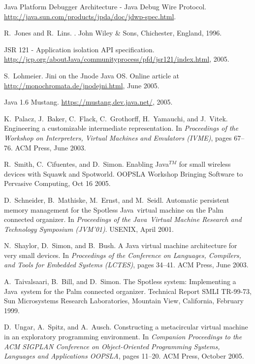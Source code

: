 \documentclass{sigplanconf}
\begin{document}
\begin{thebibliography}{GFWK02}
Java {P}latform {D}ebugger {A}rchitecture - {J}ava {D}ebug {W}ire {P}rotocol.
\newblock \url{http://java.sun.com/products/jpda/doc/jdwp-spec.html}.

\vfill\eject

R.~Jones and R.~Lins.
.
\newblock John Wiley \& Sons, Chichester, England, 1996.

{JSR} 121 - {A}pplication isolation {API} specification.
\newblock
  \url{http://jcp.org/aboutJava/communityprocess/pfd/jsr121/index.html}, 2005.

S.~Lohmeier.
\newblock Jini on the {J}node {J}ava {OS}.
\newblock Online article at \url{http://monochromata.de/jnodejni.html}, June
  2005.

Java 1.6 {M}ustang.
\newblock \url{https://mustang.dev.java.net/}, 2005.

K.~Palacz, J.~Baker, C.~Flack, C.~Grothorff, H.~Yamauchi, and J.~Vitek.
\newblock Engineering a customizable intermediate representation.
\newblock In {\em Proceedings of the Workshop on Interpreters, Virtual Machines
  and Emulators ({IVME})}, pages 67--76. {ACM} Press, June 2003.

R.~Smith, C.~Cifuentes, and D.~Simon.
\newblock Enabling {J}ava$^{TM}$ for small wireless devices with {S}quawk and
  {S}potworld.
\newblock OOPSLA Workshop Bringing Software to Pervasive Computing, Oct 16
  2005.

D.~Schneider, B.~Mathiske, M.~Ernst, and M.~Seidl.
\newblock Automatic persistent memory management for the {S}potless
  {J}ava\texttrademark\ virtual machine on the {P}alm connected organizer.
\newblock In {\em Proceedings of the {J}ava\texttrademark\ Virtual Machine
  Research and Technology Symposium ({JVM'01})}. {USENIX}, April 2001.

N.~Shaylor, D.~Simon, and B.~Bush.
\newblock A {J}ava virtual machine architecture for very small devices.
\newblock In {\em Proceedings of the Conference on Languages, Compilers, and
  Tools for Embedded Systems (LCTES)}, pages 34--41. {ACM} Press, June 2003.

A.~Taivalsaari, B.~Bill, and D.~Simon.
\newblock The {S}potless system: Implementing a {J}ava\texttrademark\ system
  for the {P}alm connected organizer.
\newblock Technical Report {SMLI TR}-99-73, Sun Microsystems Research
  Laboratories, Mountain View, California, February 1999.

D.~Ungar, A.~Spitz, and A.~Ausch.
\newblock Constructing a metacircular virtual machine in an exploratory
  programming environment.
\newblock In {\em Companion Proceedings to the {ACM SIGPLAN} Conference on
  Object-Oriented Programming Systems, Languages and Applications {OOPSLA}},
  pages 11--20. {ACM} Press, October 2005.

\end{thebibliography}
\end{document}
